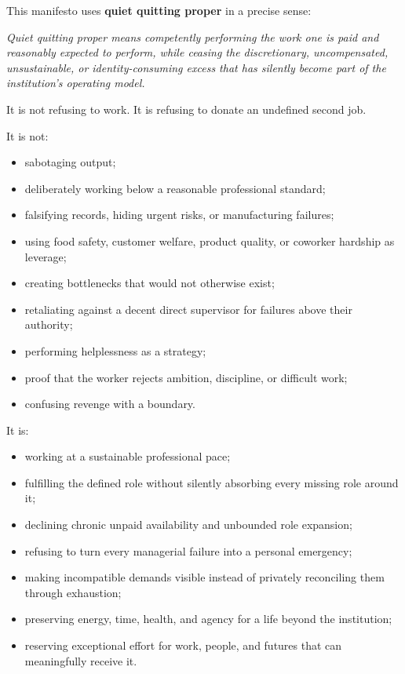 \documentclass[11pt,oneside]{article}
\providecommand{\tightlist}{%
  \setlength{\itemsep}{0.22em}\setlength{\parskip}{0pt}}
\renewenvironment{quote}
  {\begin{tcolorbox}[
      enhanced,
      breakable,
      colback=ManifestLight,
      colframe=ManifestRule,
      boxrule=0pt,
      leftrule=3pt,
      arc=0pt,
      outer arc=0pt,
      left=10pt,right=10pt,top=8pt,bottom=8pt,
      before skip=0.8em,after skip=0.8em
    ]\itshape}
  {\end{tcolorbox}}
\begin{document}
This manifesto uses \textbf{quiet quitting proper} in a precise sense:

\begin{quote}
Quiet quitting proper means competently performing the work one is paid
and reasonably expected to perform, while ceasing the discretionary,
uncompensated, unsustainable, or identity-consuming excess that has
silently become part of the institution's operating model.
\end{quote}

It is not refusing to work. It is refusing to donate an undefined second
job.

It is not:

\begin{itemize}
\tightlist
\item
  sabotaging output;
\item
  deliberately working below a reasonable professional standard;
\item
  falsifying records, hiding urgent risks, or manufacturing failures;
\item
  using food safety, customer welfare, product quality, or coworker
  hardship as leverage;
\item
  creating bottlenecks that would not otherwise exist;
\item
  retaliating against a decent direct supervisor for failures above
  their authority;
\item
  performing helplessness as a strategy;
\item
  proof that the worker rejects ambition, discipline, or difficult work;
\item
  confusing revenge with a boundary.
\end{itemize}

It is:

\begin{itemize}
\tightlist
\item
  working at a sustainable professional pace;
\item
  fulfilling the defined role without silently absorbing every missing
  role around it;
\item
  declining chronic unpaid availability and unbounded role expansion;
\item
  refusing to turn every managerial failure into a personal emergency;
\item
  making incompatible demands visible instead of privately reconciling
  them through exhaustion;
\item
  preserving energy, time, health, and agency for a life beyond the
  institution;
\item
  reserving exceptional effort for work, people, and futures that can
  meaningfully receive it.
\end{itemize}
\end{document}
